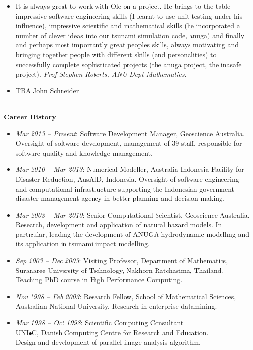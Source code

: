 \documentclass[11pt,a4paper]{article}
\begin{document}
\begin{itemize}
  \item It is always great to work with Ole on a project. He brings to the table impressive software engineering skills (I learnt to use unit testing under his influence), impressive scientific and mathematical skills (he incorporated a number of clever ideas into our tsunami simulation code, anuga) and finally and perhaps most importantly great peoples skills, always motivating and bringing together people with different skills (and personalities) to successfully complete sophisticated projects (the anuga project, the inasafe project). \emph{Prof Stephen Roberts, ANU Dept Mathematics}.
  \item TBA John Schneider
\end{itemize}

\begin{center}
  \hrulefill \\
  {\bf Career History} \\[-0.2cm]
  \hrulefill
\end{center}

\begin{itemize}
\item {\em Mar 2013 -- Present}: Software Development Manager, Geoscience Australia.
      Oversight of software development, management of 39 staff, responsible for software quality and knowledge management.
\item {\em Mar 2010 -- Mar 2013}: Numerical Modeller, Australia-Indonesia Facility for Disaster Reduction, AusAID, Indonesia.
      Oversight of software engineering and computational infrastructure supporting the Indonesian government disaster management agency in better planning and decision making.
\item {\em Mar 2003 -- Mar 2010}: Senior Computational Scientist, Geoscience Australia.
      Research, development and application of natural hazard models. In particular, leading the development of ANUGA hydrodynamic modelling and its application in tsunami impact modelling.
\item {\em Sep 2003 -- Dec 2003}: Visiting Professor,
      Department of Mathematics,
      Suranaree University of Technology, Nakhorn Ratchasima, Thailand. Teaching PhD course in
      High Performance Computing.
\item {\em Nov 1998 -- Feb 2003}: Research Fellow,
      School of Mathematical Sciences, Australian National University.
      Research in enterprise datamining.
\item {\em Mar 1998 -- Oct 1998}: Scientific Computing Consultant \\
      UNI$\bullet$C, Danish Computing Centre for Research and Education.\\
      Design and development of parallel image analysis algorithm.
\end{itemize}
\end{document}
